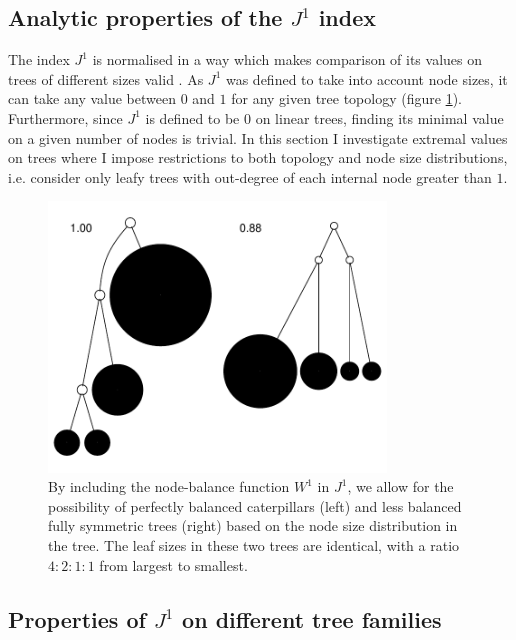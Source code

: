 \subsection{Analytic properties of the $J^1$ index}
The index $J^1$ is normalised in a way which makes comparison of its values on
trees of different sizes valid \citep{lemant_robust_2022}. As $J^1$ was defined
to take into account node sizes, it can take any value between $0$ and $1$ for
any given tree topology (figure \ref{balcat}). Furthermore, since $J^1$ is
defined to be $0$ on linear trees, finding its minimal value on a given number
of nodes is trivial. In this section I investigate extremal values on trees
where I impose restrictions to both topology and node size distributions, i.e.
consider only leafy trees with out-degree of each internal node greater than $1$.

\begin{figure}[h]
    \centering
    \includegraphics[width=0.8\textwidth]{Chapter_2/figures/balcat.pdf}
    \caption{By including the node-balance function $W^1$ in $J^1$, we allow for
    the possibility of perfectly balanced caterpillars (left) and less balanced
    fully symmetric trees (right) based on the node size distribution in the
    tree. The leaf sizes in these two trees are identical, with a ratio
    $4:2:1:1$ from largest to smallest.}
    \label{balcat}
\end{figure}

\subsection{Properties of $J^1$ on different tree families}

